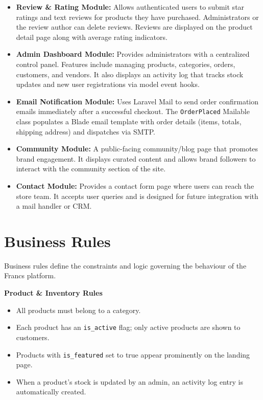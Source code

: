 \begin{itemize}
    \item \textbf{Review \& Rating Module:} Allows authenticated users to submit star ratings and text reviews for products they have purchased. Administrators or the review author can delete reviews. Reviews are displayed on the product detail page along with average rating indicators.

    \item \textbf{Admin Dashboard Module:} Provides administrators with a centralized control panel. Features include managing products, categories, orders, customers, and vendors. It also displays an activity log that tracks stock updates and new user registrations via model event hooks.

    \item \textbf{Email Notification Module:} Uses Laravel Mail to send order confirmation emails immediately after a successful checkout. The \texttt{OrderPlaced} Mailable class populates a Blade email template with order details (items, totals, shipping address) and dispatches via SMTP.

    \item \textbf{Community Module:} A public-facing community/blog page that promotes brand engagement. It displays curated content and allows brand followers to interact with the community section of the site.

    \item \textbf{Contact Module:} Provides a contact form page where users can reach the store team. It accepts user queries and is designed for future integration with a mail handler or CRM.
\end{itemize}

\section{Business Rules}

Business rules define the constraints and logic governing the behaviour of the Francs platform.

\textbf{Product \& Inventory Rules}
\begin{itemize}
    \item All products must belong to a category.
    \item Each product has an \texttt{is\_active} flag; only active products are shown to customers.
    \item Products with \texttt{is\_featured} set to true appear prominently on the landing page.
    \item When a product's stock is updated by an admin, an activity log entry is automatically created.
\end{itemize}

